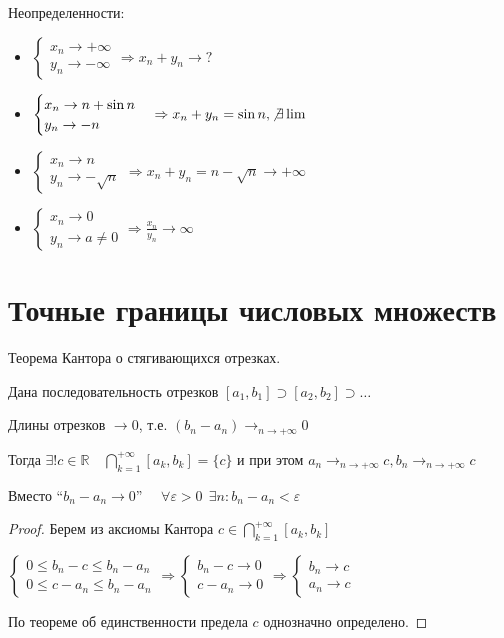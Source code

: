 Неопределенности:
\begin{itemize}
    \item $
    \begin{cases}
        x_n\to +\infty \\
        y_n\to-\infty
    \end{cases}
\Rightarrow x_n+y_n\to?$
\item $\begin{cases}
    x_n\to n+\sin n \\
    y_n\to-n
\end{cases}
\Rightarrow x_n+y_n=\sin n, \not\exists\lim$
\item $\begin{cases}
    x_n\to n \\
    y_n\to -\sqrt n
\end{cases}
\Rightarrow x_n+y_n=n-\sqrt n\to+\infty$
\item $\begin{cases}
    x_n\to 0 \\
    y_n\to a\not = 0
\end{cases}
\Rightarrow \frac{x_n}{y_n}\to\infty$
\end{itemize}

\section{Точные границы числовых множеств}

\begin{theorem}
Теорема Кантора о стягивающихся отрезках.

Дана последовательность отрезков $[a_1, b_1]\supset[a_2, b_2]\supset\ldots$

Длины отрезков $\to 0$, т.е. $(b_n-a_n)\to_{n\to+\infty}0$

Тогда $\exists!c\in\mathbb{R} \quad \bigcap\limits_{k=1}^{+\infty}[a_k, b_k]=\{c\}$ и при этом $a_n\to_{n\to+\infty} c, b_n\to_{n\to+\infty} c$
\end{theorem}

\begin{remark}
Вместо ``$b_n-a_n\to 0$'' $\quad \forall \varepsilon>0 \ \ \exists n : b_n-a_n<\varepsilon$
\end{remark}

\begin{proof}
Берем из аксиомы Кантора $c\in\bigcap\limits_{k=1}^{+\infty}[a_k, b_k]$

$\begin{cases}
    0 \leq b_n-c\leq b_n-a_n \\
    0 \leq c-a_n\leq b_n-a_n
\end{cases} \Rightarrow \begin{cases}
    b_n-c\to 0 \\
    c-a_n\to 0
\end{cases} \Rightarrow \begin{cases}
    b_n\to c \\
    a_n\to c
\end{cases}$

По теореме об единственности предела $c$ однозначно определено.
\end{proof}

